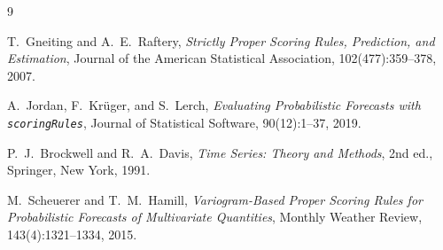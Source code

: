 \documentclass[11pt]{article}
\theoremstyle{definition}
\theoremstyle{remark}
\begin{document}
\begin{thebibliography}{9}

T.~Gneiting and A.~E.~Raftery,
\emph{Strictly Proper Scoring Rules, Prediction, and Estimation},
Journal of the American Statistical Association, 102(477):359--378, 2007.

A.~Jordan, F.~Kr\"uger, and S.~Lerch,
\emph{Evaluating Probabilistic Forecasts with \texttt{scoringRules}},
Journal of Statistical Software, 90(12):1--37, 2019.

P.~J.~Brockwell and R.~A.~Davis,
\emph{Time Series: Theory and Methods}, 2nd ed.,
Springer, New York, 1991.

M.~Scheuerer and T.~M.~Hamill,
\emph{Variogram-Based Proper Scoring Rules for Probabilistic Forecasts
of Multivariate Quantities},
Monthly Weather Review, 143(4):1321--1334, 2015.

\end{thebibliography}
\end{document}
